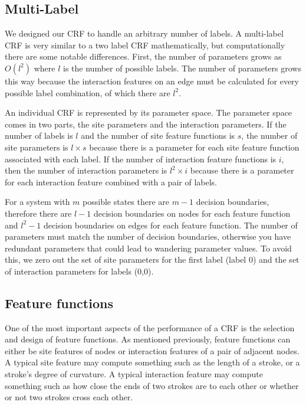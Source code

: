 \documentclass[10pt]{acmsiggraph}               %
\begin{document}
\subsection{Multi-Label}
We designed our CRF to handle an arbitrary number of labels. A multi-label CRF is very similar to a two label CRF mathematically, but computationally there are some notable differences. First, the number of parameters grows as $O(l^2)$ where $l$ is the number of possible labels. The number of parameters grows this way because the interaction features on an edge must be calculated for every possible label combination, of which there are $l^2$. 

An individual CRF is represented by its parameter space. The parameter space comes in two parts, the site parameters and the interaction parameters. If the number of labels is $l$ and the number of site feature functions is $s$, the number of site parameters  is $l\times s$ because there is a parameter for each site feature function associated with each label.  If the number of interaction feature functions is $i$, then the number of interaction parameters is $l^2\times i$ because there is a parameter for each interaction feature combined with a pair of labels.

For a system with $m$ possible states there are $m-1$ decision boundaries, therefore there are $l-1$ decision boundaries on nodes for each feature function and $l^2-1$ decision boundaries on edges for each feature function. The number of parameters must match the number of decision boundaries, otherwise you have redundant parameters that could lead to wandering parameter values. To avoid this, we zero out the set of site parameters for the first label (label 0) and the set of interaction parameters for labels (0,0). 

\subsection{Feature functions}
One of the most important aspects of the performance of a CRF is the selection and design of feature functions.  As mentioned previously, feature functions can either be site features of nodes or interaction features of a pair of adjacent nodes.  A typical site feature may compute something such as the length of a stroke, or a stroke's degree of curvature. A typical interaction feature may compute something such as how close the ends of two strokes are to each other or whether or not two strokes cross each other.
\end{document}
